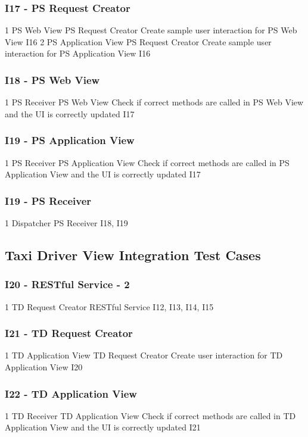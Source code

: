 \subsubsection{I17 - PS Request Creator}
\testCaseSimple
	{1}
	{PS Web View}
	{PS Request Creator}
	{Create sample user interaction for PS Web View}
	{I16}
\testCaseSimple
	{2}
	{PS Application View}
	{PS Request Creator}
	{Create sample user interaction for PS Application View}	
	{I16}
\subsubsection{I18 - PS Web View}
\testCaseSimplee
	{1}
	{PS Receiver}
	{PS Web View}
	{Check if correct methods are called in PS Web View and the UI is correctly updated}
	{I17}
\subsubsection{I19 - PS Application View}
\testCaseSimplee
	{1}
	{PS Receiver}
	{PS Application View}
	{Check if correct methods are called in PS Application View and the UI is correctly updated}
	{I17}
\subsubsection{I19 - PS Receiver}
\testCaseSimpleSimple
	{1}
	{Dispatcher}
	{PS Receiver}
	{I18, I19}
\subsection{Taxi Driver View Integration Test Cases}
\subsubsection{I20 - RESTful Service - 2}
\testCaseSimpleSimple
	{1}
	{TD Request Creator}
	{RESTful Service}
	{I12, I13, I14, I15}
\subsubsection{I21 - TD Request Creator}
\testCaseSimple
	{1}
	{TD Application View}
	{TD Request Creator}
	{Create user interaction for TD Application View}
	{I20}
\subsubsection{I22 - TD Application View}
\testCaseSimplee
	{1}
	{TD Receiver}
	{TD Application View}
	{Check if correct methods are called in TD Application View and the UI is correctly updated}
	{I21}
